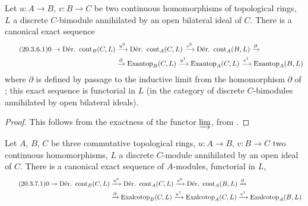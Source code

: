 \begin{proposition}[20.3.6]
\label{0.20.3.6}
Let $u:A\to B$, $v:B\to C$ be two continuous homomorphisms of topological rings, $L$ a discrete $C$-bimodule annihilated by an open bilateral ideal of $C$.
There is a canonical exact sequence
\begin{align}
\tag{20.3.6.1}
  \label{0.20.3.6.1}
  0\to\operatorname{D\acute{e}r.\ cont}_B(C,L)&\xrightarrow{u^0}\operatorname{D\acute{e}r.\ cont}_A(C,L)\xrightarrow{v^0}\operatorname{D\acute{e}r.\ cont}_A(B,L)\xrightarrow{\partial} \\
  &\xrightarrow{\partial}\operatorname{Exantop}_B(C,L)\xrightarrow{u^1}\operatorname{Exantop}_A(C,L)\xrightarrow{v^1}\operatorname{Exantop}_A(B,L) \notag
\end{align}
where $\partial$ is defined by passage to the inductive limit from the homomorphism $\partial$ of ; this exact sequence is functorial in $L$ (in the category of discrete $C$-bimodules annihilated by open bilateral ideals).
\end{proposition}

\begin{proof}
This follows from the exactness of the functor $\varinjlim$, from .
\end{proof}

\begin{corollary}[20.3.7]
\label{0.20.3.7}
Let $A$, $B$, $C$ be three commutative topological rings, $u:A\to B$, $v:B\to C$ two continuous homomorphisms, $L$ a discrete $C$-module annihilated by an open ideal of $C$.
There is a canonical exact sequence of $A$-modules, functorial in $L$,
\begin{align}
\tag{20.3.7.1}
  \label{0.20.3.7.1}
  0\to\operatorname{D\acute{e}r.\ cont}_B(C,L)&\xrightarrow{u^0}\operatorname{D\acute{e}r.\ cont}_A(C,L)\xrightarrow{v^0}\operatorname{D\acute{e}r.\ cont}_A(B,L)\xrightarrow{\partial} \\
  &\xrightarrow{\partial}\operatorname{Exalcotop}_B(C,L)\xrightarrow{u^1}\operatorname{Exalcotop}_A(C,L)\xrightarrow{v^1}\operatorname{Exalcotop}_A(B,L). \notag
\end{align}
\end{corollary}

